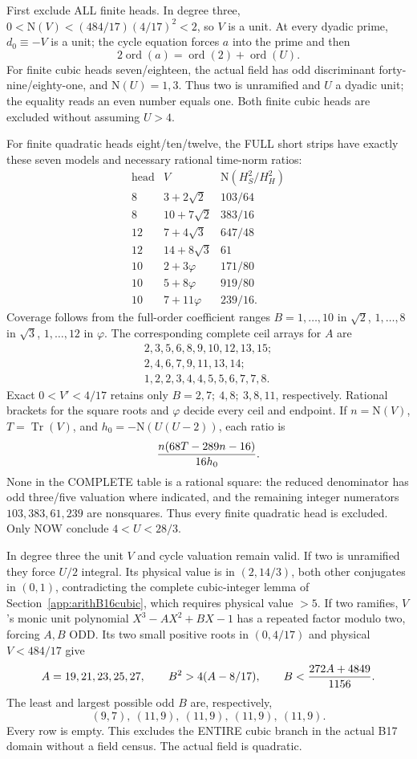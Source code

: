 First exclude ALL finite heads.
In degree three,
\(0<\mathrm N(V)<(484/17)(4/17)^2<2\),
so \(V\) is a unit.
At every dyadic prime, \(d_0\equiv-V\) is a unit;
the cycle equation forces \(a\) into the prime
and then
\[
                     2\operatorname{ord}(a)
                      =\operatorname{ord}(2)+\operatorname{ord}(U).
\]
For finite cubic heads seven/eighteen,
the actual field has odd discriminant
forty-nine/eighty-one, and \(\mathrm N(U)=1,3\).
Thus two is unramified and \(U\) a dyadic unit;
the equality reads an even number equals one.
Both finite cubic heads are excluded without
assuming \(U>4\).

For finite quadratic heads eight/ten/twelve,
the FULL short strips have exactly these seven
models and necessary rational time-norm ratios:
\[
\begin{array}{c|c|c}
 \text{head}&V&
 \mathrm N(H_S^2/H_H^2)\\ \hline
8&3+2\sqrt2&103/64\\
8&10+7\sqrt2&383/16\\
12&7+4\sqrt3&647/48\\
12&14+8\sqrt3&61\\
10&2+3\varphi&171/80\\
10&5+8\varphi&919/80\\
10&7+11\varphi&239/16 .
\end{array}
\]
Coverage follows from the full-order coefficient
ranges \(B=1,\ldots,10\) in \(\sqrt2\),
\(1,\ldots,8\) in \(\sqrt3\),
\(1,\ldots,12\) in \(\varphi\).
The corresponding complete ceil arrays for \(A\) are
\[
 \begin{gathered}
 2,3,5,6,8,9,10,12,13,15;\\
 2,4,6,7,9,11,13,14;\\
 1,2,2,3,4,4,5,5,6,7,7,8 .
 \end{gathered}
\]
Exact \(0<V'<4/17\) retains only
\(B=2,7;\ 4,8;\ 3,8,11\), respectively.
Rational brackets for the square roots and
\(\varphi\) decide every ceil and endpoint.
If \(n=\mathrm N(V)\), \(T=\operatorname{Tr}(V)\),
and \(h_0=-\mathrm N(U(U-2))\), each ratio is
\[
                     {n(68T-289n-16)\over16h_0}.
\]
None in the COMPLETE table is a rational square:
the reduced denominator has odd three/five
valuation where indicated, and the remaining
integer numerators \(103,383,61,239\) are
nonsquares.
Thus every finite quadratic head is excluded.
Only NOW conclude \(4<U<28/3\).

In degree three the unit \(V\) and cycle valuation
remain valid.
If two is unramified they force \(U/2\) integral.
Its physical value is in \((2,14/3)\), both other
conjugates in \((0,1)\), contradicting the
complete cubic-integer lemma of
Section~\ref{app:arithB16cubic}, which requires
physical value \(>5\).
If two ramifies, \(V\)'s monic unit polynomial
\(X^3-AX^2+BX-1\) has a repeated factor modulo
two, forcing \(A,B\) ODD.
Its two small positive roots in \((0,4/17)\)
and physical \(V<484/17\) give
\[
 A=19,21,23,25,27,\qquad
 B^2>4(A-8/17),\qquad
 B<{272A+4849\over1156}.
\]
The least and largest possible odd \(B\) are,
respectively,
\[
                (9,7),\ (11,9),\ (11,9),\ (11,9),\ (11,9).
\]
Every row is empty.
This excludes the ENTIRE cubic branch in the
actual B17 domain without a field census.
The actual field is quadratic.


